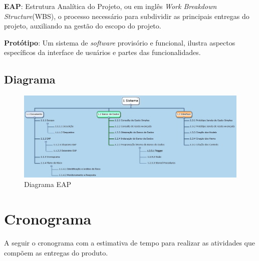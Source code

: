 \documentclass[a4paper,12pt]{article}
\begin{document}
{\bf EAP}: Estrutura Analítica do Projeto, ou em inglês \textit{Work Breakdown Structure}(WBS), o processo necessário para subdividir as principais entregas do projeto, auxiliando na gestão do escopo do projeto.

{\bf Protótipo}: Um sistema de \textit{software} provisório e funcional, ilustra aspectos específicos da interface de usuários e partes das funcionalidades.

\subsection{Diagrama}


\begin{figure}[!htb]
	\centering
	\includegraphics[width=\textwidth,height=\textheight,keepaspectratio]{Imagens/trab_copy.jpg}
  	\caption{Diagrama EAP}
\end{figure}


\newpage
\section{Cronograma}

A seguir o cronograma com a estimativa de tempo para realizar as atividades que compõem as entregas do produto.\\
\end{document}
